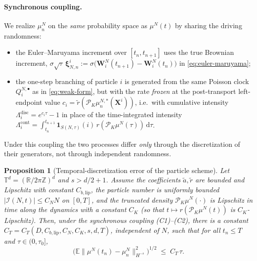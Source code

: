 \documentclass[12pt]{article}
\newtheorem{proposition}{Proposition}[section]
\begin{document}
\paragraph{Synchronous coupling.}
We realize $\mu^N_n$ on the \emph{same} probability space as $\mu^N(t)$ by
sharing the driving randomness:
\begin{itemize}
\item[(C1)] the Euler--Maruyama increment over $[t_n,t_{n+1}]$ uses the true
Brownian increment, $\sigma\sqrt{\tau}\,\boldsymbol\xi^i_{N,n}
:=\sigma\big(\mathbf W^N_i(t_{n+1})-\mathbf W^N_i(t_n)\big)$ in
\eqref{eq:euler-maruyama};
\item[(C2)] the one-step branching of particle $i$ is generated from the same
Poisson clock $Q^{N,\bullet}_i$ as in \eqref{eq:weak-form}, but with the rate
\emph{frozen} at the post-transport left-endpoint value
$c_i=\tilde r(\mathcal P_K\mu^{N,*}_n(\mathbf X^i))$, i.e.\ with cumulative
intensity $\Lambda^{\mathrm{disc}}_i=e^{c_i\tau}-1$ in place of the
time-integrated intensity
$\Lambda^{\mathrm{cont}}_i=\int_{t_n}^{t_{n+1}}\mathbf 1_{S(N,\tau)}(i)\,
r(\mathcal P_K\mu^N(\tau))\,\mathrm d\tau$.
\end{itemize}
Under this coupling the two processes differ \emph{only} through the
discretization of their generators, not through independent randomness.

\begin{proposition}[Temporal-discretization error of the particle scheme]
\label{prop:time-particle}
Let $\mathbb T^d=(\mathbb R/2\pi\mathbb Z)^d$ and $s>d/2+1$. Assume the
coefficients $\tilde a,\tilde r$ are bounded and Lipschitz with constant
$C_{b,\mathrm{lip}}$, the particle number is uniformly bounded
$|\mathcal I(N,t)|\le C_N N$ on $[0,T]$, and the truncated density
$\mathcal P_K\mu^N(\cdot)$ is Lipschitz in time along the dynamics with a
constant $C_K$ (so that $t\mapsto r(\mathcal P_K\mu^N(t))$ is $C_K$-Lipschitz).
Then, under the synchronous coupling (C1)--(C2), there is a constant
$C_T=C_T(D,C_{b,\mathrm{lip}},C_N,C_K,s,d,T)$, independent of $N$, such that for
all $t_n\le T$ and $\tau\in(0,\tau_0]$,
\[
\Big(\mathbb E\big\|\mu^N(t_n)-\mu^N_n\big\|_{H^{-s}}^2\Big)^{1/2}
\;\le\; C_T\,\tau .
\]
\end{proposition}
\end{document}

